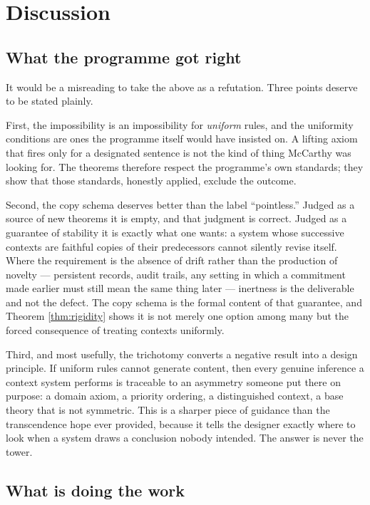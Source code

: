 \documentclass[11pt]{article}
\theoremstyle{plain}
\theoremstyle{definition}
\theoremstyle{remark}
\begin{document}
\section{Discussion}

\subsection{What the programme got right}

It would be a misreading to take the above as a refutation. Three points deserve
to be stated plainly.

First, the impossibility is an impossibility for \emph{uniform} rules, and the
uniformity conditions are ones the programme itself would have insisted on. A
lifting axiom that fires only for a designated sentence is not the kind of thing
McCarthy was looking for. The theorems therefore respect the programme's own
standards; they show that those standards, honestly applied, exclude the
outcome.

Second, the copy schema deserves better than the label ``pointless.'' Judged as
a source of new theorems it is empty, and that judgment is correct. Judged as a
guarantee of stability it is exactly what one wants: a system whose successive
contexts are faithful copies of their predecessors cannot silently revise itself.
Where the requirement is the absence of drift rather than the production of
novelty --- persistent records, audit trails, any setting in which a commitment
made earlier must still mean the same thing later --- inertness is the
deliverable and not the defect. The copy schema is the formal content of that
guarantee, and Theorem \ref{thm:rigidity} shows it is not merely one option among
many but the forced consequence of treating contexts uniformly.

Third, and most usefully, the trichotomy converts a negative result into a
design principle. If uniform rules cannot generate content, then every genuine
inference a context system performs is traceable to an asymmetry someone put
there on purpose: a domain axiom, a priority ordering, a distinguished context, a
base theory that is not symmetric. This is a sharper piece of guidance than the
transcendence hope ever provided, because it tells the designer exactly where to
look when a system draws a conclusion nobody intended. The answer is never the
tower.

\subsection{What is doing the work}
\end{document}
